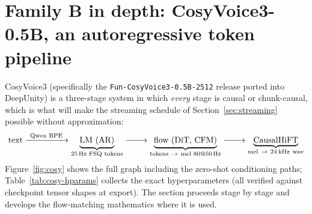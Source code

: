 \documentclass[11pt,a4paper]{article}
\newcommand{\code}[1]{\texttt{#1}}
\begin{document}
\section{Family B in depth: CosyVoice3-0.5B, an autoregressive token pipeline}
\label{sec:cosy}

CosyVoice3 (specifically the \code{Fun-CosyVoice3-0.5B-2512} release ported into
DeepUnity) is a three-stage system in which \emph{every} stage is causal or
chunk-causal, which is what will make the streaming schedule of
Section~\ref{sec:streaming} possible without approximation:
\begin{equation*}
\text{text} \xrightarrow{\ \text{Qwen BPE}\ }
\underbrace{\text{LM (AR)}}_{\text{25\,Hz FSQ tokens}} \xrightarrow{\qquad}
\underbrace{\text{flow (DiT, CFM)}}_{\text{tokens}\ \to\ \text{mel } 80@50\,\mathrm{Hz}}
\xrightarrow{\qquad}
\underbrace{\text{CausalHiFT}}_{\text{mel}\ \to\ 24\,\mathrm{kHz\ wav}}
\end{equation*}
Figure~\ref{fig:cosy} shows the full graph including the zero-shot conditioning paths;
Table~\ref{tab:cosy-hparams} collects the exact hyperparameters (all verified against
checkpoint tensor shapes at export). The section proceeds stage by stage and develops
the flow-matching mathematics where it is used.
\end{document}
